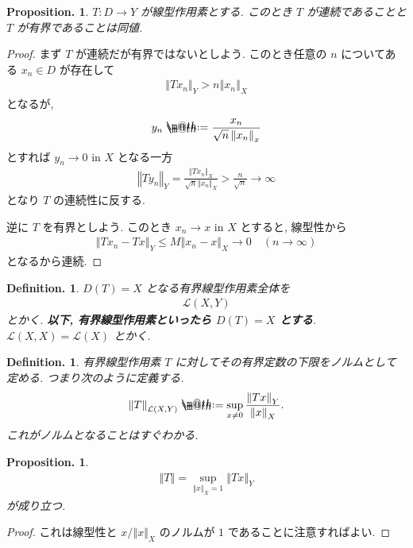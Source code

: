 \documentclass[openany, a4paper, oneside]{jsbook}
\makeatletter
\newcommand*{\defeq}{\mathrel{\rlap{%
\raisebox{0.3ex}{$\m@th\cdot$}}%
\raisebox{-0.3ex}{$\m@th\cdot$}}%
=}
\theoremstyle{break}
\theoremstyle{breakdefn}
\newtheorem{prop}[thm]{Proposition.}
\newtheorem{defn}[thm]{Definition.}
\newcommand{\norm}[1]{\left\Vert#1\right\Vert}
\newcommand{\calL}{\mathcal{L}}
\makeatother
\begin{document}
\begin{prop}
$T \colon D \to Y$ が線型作用素とする.
このとき $T$ が連続であることと $T$ が有界であることは同値.
\end{prop}
\begin{proof}
まず $T$ が連続だが有界ではないとしよう.
このとき任意の $n$ についてある $x_n \in D$ が存在して
\begin{align}
 \norm{Tx_n}_Y
 >
 n \norm{x_n}_X
\end{align}
となるが,
\begin{align}
 y_n
 \defeq
 \frac{x_n}{\sqrt{n} \norm{x_n}_x}
\end{align}
とすれば
$y_n \to 0$ in $X$ となる一方
\begin{align}
 \norm{T y_n}_Y
 =
 \frac{\norm{T x_n}_X}{\sqrt{n} \norm{x_n}_X}
 >
 \frac{n}{\sqrt{n}} \to \infty
\end{align}
となり $T$ の連続性に反する.

逆に $T$ を有界としよう.
このとき $x_n \to x$ in $X$ とすると, 線型性から
\begin{align}
 \norm{Tx_n - Tx}_Y
 \le
 M \norm{x_n - x}_X \to 0 \quad (n \to \infty)
\end{align}
となるから連続.
\end{proof}

\begin{defn}
$D(T) = X$ となる有界線型作用素全体を
\begin{align}
 \mathcal{L}(X, Y)
\end{align}
とかく.
\textbf{以下, 有界線型作用素といったら $D(T)=X$ とする}.
$\mathcal{L}(X, X) = \mathcal{L}(X)$ とかく.
\end{defn}
\begin{defn}
有界線型作用素 $T$ に対してその有界定数の下限をノルムとして定める.
つまり次のように定義する.
\begin{align}
 \norm{T}_{\calL (X, Y)}
 \defeq
 \sup_{x \neq 0} \frac{\norm{Tx}_Y}{\norm{x}_X}.
\end{align}
これがノルムとなることはすぐわかる.
\end{defn}

\begin{prop}
\begin{align}
 \norm{T}
 =
 \sup_{\norm{x}_X = 1} \norm{Tx}_Y
\end{align}
が成り立つ.
\end{prop}
\begin{proof}
これは線型性と $x / {\norm{x}_X}$ のノルムが $1$ であることに注意すればよい.
\end{proof}
\end{document}

